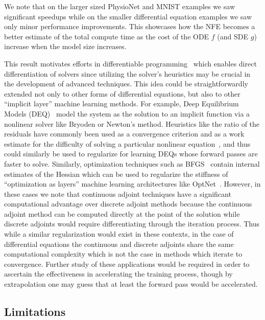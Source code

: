 We note that on the larger sized PhysioNet and MNIST examples we saw significant speedups while on the smaller differential equation examples we saw only minor performance improvements. This showcases how the NFE becomes a better estimate of the total compute time as the cost of the ODE $f$ (and SDE $g$) increase when the model size increases.

This result motivates efforts in differentiable programming~\citep{wang2018backpropagation, abadi2019simple, rackauckas2020generalized} which enables direct differentiation of solvers since utilizing the solver's heuristics may be crucial in the development of advanced techniques. This idea could be straightforwardly extended not only to other forms of differential equations, but also to other ``implicit layer'' machine learning methods. For example, Deep Equilibrium Models (DEQ)~\citep{bai_deep_2019} model the system as the solution to an implicit function via a nonlinear solver like Bryoden or Newton's method. Heuristics like the ratio of the residuals have commonly been used as a convergence criterion and as a work estimate for the difficulty of solving a particular nonlinear equation~\citep{wanner1996solving}, and thus could similarly be used to regularize for learning DEQs whose forward passes are faster to solve. Similarly, optimization techniques such as BFGS~\citep{kelley1999iterative} contain internal estimates of the Hessian which can be used to regularize the stiffness of ``optimization as layers'' machine learning architectures like OptNet~\citep{amos2017optnet}. However, in these cases we note that continuous adjoint techniques have a significant computational advantage over discrete adjoint methods because the continuous adjoint method can be computed directly at the point of the solution while discrete adjoints would require differentiating through the iteration process. Thus while a similar regularization would exist in these contexts, in the case of differential equations the continuous and discrete adjoints share the same computational complexity which is not the case in methods which iterate to convergence. Further study of these applications would be required in order to ascertain the effectiveness in accelerating the training process, though by extrapolation one may guess that at least the forward pass would be accelerated.

\subsection{Limitations}
\label{subsec:limitations_of_using_error_and_stiffness_estimates}


